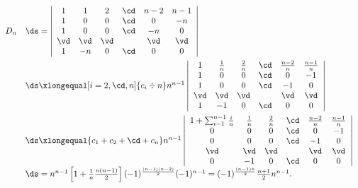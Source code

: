 \begin{jie}
$$
\begin{array}{ll}
  D_n & \ds = \left|
        \begin{array}{cccccc}
          1   &  1 &  2 & \cd &  n-2 & n-1\\
          1   &  0 &  0 & \cd &   0  & -n \\
          1   &  0 &  0 & \cd &  -n  & 0\\
          \vd & \vd & \vd&     & \vd  & \vd \\
          1   & -n &  0 & \cd &   0   & 0
        \end{array}
                                        \right| \\[1.0cm]
      &  \ds \xlongequal[i=2,\cd,n]{c_i\div n} n^{n-1} 
        \left|
        \begin{array}{cccccc}
          1   &  \frac 1n & \frac 2n & \cd &  \frac{n-2}n & \frac{n-1}n\\
          1   &  0 &  0 & \cd &   0  & -1 \\
          1   &  0 &  0 & \cd &  -1  & 0\\
          \vd & \vd & \vd&     & \vd  & \vd \\
          1   & -1 &  0 & \cd &   0   & 0
        \end{array}
                                        \right|\\[1.0cm]
      & \ds \xlongequal{c_1+c_2+\cd+c_n} 
        n^{n-1} \left|
        \begin{array}{cccccc}
          1+\sum_{i-1}^{n-1}\frac in   &  \frac 1n & \frac 2n & \cd &  \frac{n-2}n & \frac{n-1}n\\
          0   &  0 &  0 & \cd &   0  & -1 \\
          0   &  0 &  0 & \cd &  -1  & 0\\
          \vd & \vd & \vd&     & \vd  & \vd \\
          0   & -1 &  0 & \cd &   0   & 0
        \end{array}       
                                        \right|\\[0.8cm]
      &  \ds= n^{n-1} \left[ 1 + \frac 1n \frac {n(n-1)}2\right] 
        (-1)^{\frac{(n-1)(n-2)}2}(-1)^{n-1} = (-1)^{\frac{(n-1)n}2} \frac{n+1}2 n^{n-1}.
\end{array}
$$

\end{jie}







